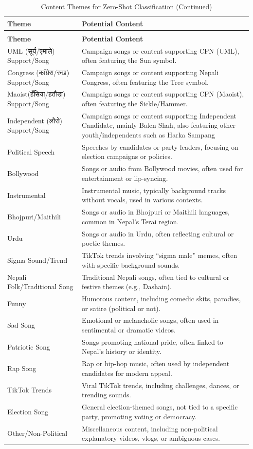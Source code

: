 \documentclass[12pt,a4paper]{report}
\begin{document}
\begin{longtable}{@{} p{7cm} p{10cm} @{}}
\caption{Content Themes for Zero-Shot Classification} \label{tab:content_themes} \\
\toprule
\textbf{Theme} & \textbf{Potential Content} \\
\midrule
\endfirsthead
\caption[]{Content Themes for Zero-Shot Classification (Continued)} \\
\toprule
\textbf{Theme} & \textbf{Potential Content} \\
\midrule
\endhead
\small
UML (\texthindi{सूर्य/एमाले}) Support/Song & Campaign songs or content supporting CPN (UML), often featuring the Sun symbol. \\
Congress (\texthindi{काँग्रेस/रुख}) Support/Song & Campaign songs or content supporting Nepali Congress, often featuring the Tree symbol. \\
Maoist(\texthindi{हँसिया/हतौडा}) Support/Song & Campaign songs or content supporting CPN (Maoist), often featuring the Sickle/Hammer. \\
Independent (\texthindi{लौरो}) Support/Song & Campaign songs or content supporting Independent Candidate, mainly Balen Shah, also featuring other youth/independents such as Harka Sampang\\

Political Speech & Speeches by candidates or party leaders, focusing on election campaigns or policies. \\
Bollywood & Songs or audio from Bollywood movies, often used for entertainment or lip-syncing. \\
Instrumental & Instrumental music, typically background tracks without vocals, used in various contexts. \\
Bhojpuri/Maithili & Songs or audio in Bhojpuri or Maithili languages, common in Nepal’s Terai region. \\
Urdu & Songs or audio in Urdu, often reflecting cultural or poetic themes. \\
Sigma Sound/Trend & TikTok trends involving ``sigma male'' memes, often with specific background sounds. \\
Nepali Folk/Traditional Song & Traditional Nepali songs, often tied to cultural or festive themes (e.g., Dashain). \\
Funny & Humorous content, including comedic skits, parodies, or satire (political or not). \\
Sad Song & Emotional or melancholic songs, often used in sentimental or dramatic videos. \\
Patriotic Song & Songs promoting national pride, often linked to Nepal’s history or identity. \\
Rap Song & Rap or hip-hop music, often used by independent candidates for modern appeal. \\
TikTok Trends & Viral TikTok trends, including challenges, dances, or trending sounds. \\
Election Song & General election-themed songs, not tied to a specific party, promoting voting or democracy. \\
Other/Non-Political & Miscellaneous content, including non-political explanatory videos, vlogs, or ambiguous cases. \\
\bottomrule
\end{longtable}
\end{document}
